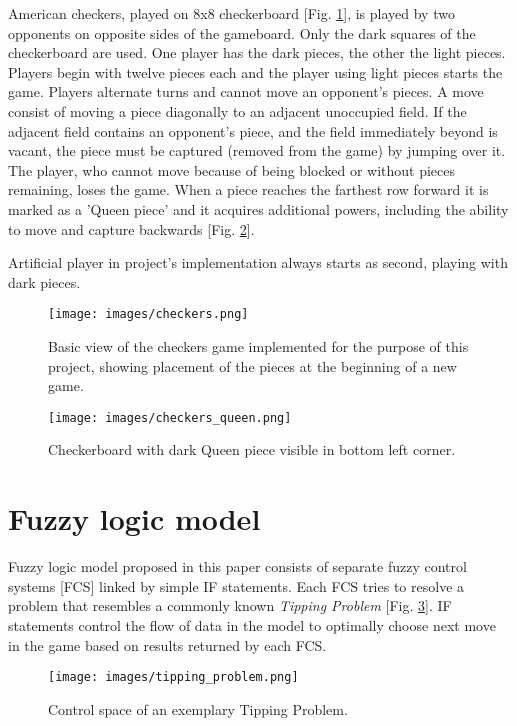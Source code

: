 \documentclass{article}
\begin{document}
American checkers, played on 8x8 checkerboard [Fig. \ref{fig:checkerboard}], is played by two opponents on opposite sides of the gameboard. Only the dark squares of the checkerboard are used. One player has the dark pieces, the other the light pieces. Players begin with twelve pieces each and the player using light pieces starts the game. Players alternate turns and cannot move an opponent's pieces. A move consist of moving a piece diagonally to an adjacent unoccupied field. If the adjacent field contains an opponent's piece, and the field immediately beyond is vacant, the piece must be captured (removed from the game) by jumping over it. The player, who cannot move because of being blocked or without pieces remaining, loses the game. When a piece reaches the farthest row forward it is marked as a 'Queen piece' and it acquires additional powers, including the ability to move and capture backwards [Fig. \ref{fig:checkerboard_queen}].

Artificial player in project's implementation always starts as second, playing with dark pieces.

\begin{figure}[tbhp]
  \centering
      \texttt{[image: images/checkers.png]}
  \caption{Basic view of the checkers game implemented for the purpose of this project, showing placement of the pieces at the beginning of a new game.}
  \label{fig:checkerboard}
\end{figure}

\begin{figure}[tbhp]
  \centering
      \texttt{[image: images/checkers\_queen.png]}
  \caption{Checkerboard with dark Queen piece visible in bottom left corner.}
  \label{fig:checkerboard_queen}
\end{figure}

\section{Fuzzy logic model}

Fuzzy logic model proposed in this paper consists of separate fuzzy control systems [FCS] linked by simple IF statements. Each FCS tries to resolve a problem that resembles a commonly known \emph{Tipping Problem} [Fig. \ref{fig:tipping_problem}]. IF statements control the flow of data in the model to optimally choose next move in the game based on results returned by each FCS.

\begin{figure}[tbhp]
  \centering
      \texttt{[image: images/tipping\_problem.png]}
  \caption{Control space of an exemplary Tipping Problem.}
  \label{fig:tipping_problem}
\end{figure}
\end{document}
